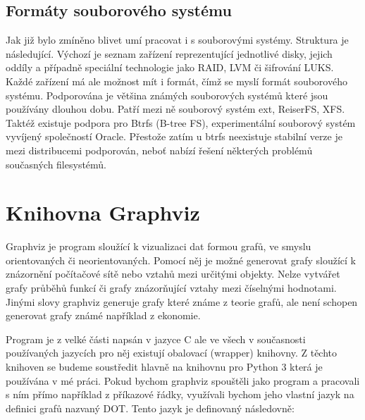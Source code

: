 \documentclass[color,table,oneside,nolot,nolof]{fithesis}
\begin{document}
\subsection{Formáty souborového systému}
  Jak již bylo zmíněno blivet umí pracovat i s souborovými systémy. Struktura je následující. Výchozí je seznam zařízení reprezentující jednotlivé disky, jejich oddíly a případně
	speciální technologie jako RAID, LVM či šifrování LUKS. Každé zařízení má ale možnost mít i formát, čímž se myslí formát souborového systému. Podporována je většina známých 
	souborových
	systémů které jsou používány dlouhou dobu. Patří mezi ně souborový systém ext, ReiserFS, XFS. Taktéž existuje podpora pro Btrfs (B-tree FS), experimentální souborový systém 
	vyvíjený společností Oracle. Přestože zatím u btrfs neexistuje stabilní verze je mezi distribucemi podporován, neboť nabízí řešení některých problémů současných filesystémů.

\section{Knihovna Graphviz}
	Graphviz je program sloužící k vizualizaci dat formou grafů, ve smyslu orientovaných či neorientovaných. Pomocí něj je možné generovat grafy sloužící k znázornění počítačové sítě nebo
	vztahů mezi určitými objekty. Nelze vytvářet grafy průběhů funkcí či grafy znázorňující vztahy mezi číselnými hodnotami. Jinými slovy graphviz generuje grafy které známe z teorie grafů,
	ale není schopen generovat grafy známé například z ekonomie.

	Program je z velké části napsán v jazyce C ale ve všech v současnosti používaných jazycích pro něj existují obalovací (wrapper) knihovny. Z těchto knihoven se budeme soustředit hlavně na
	knihovnu pro Python 3 která je používána v mé práci. Pokud bychom graphviz spouštěli jako program a pracovali s ním přímo například z příkazové řádky, využívali bychom jeho vlastní jazyk
	na definici grafů nazvaný DOT. Tento jazyk je definovaný následovně:
\end{document}
